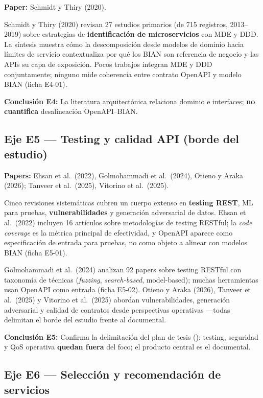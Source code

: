 \textbf{Paper:} Schmidt y Thiry (2020).

Schmidt y Thiry (2020) revisan 27 estudios primarios (de 715 registros, 2013--2019) sobre
estrategias de \textbf{identificación de microservicios} con MDE y DDD. La síntesis muestra cómo la
descomposición desde modelos de dominio hacia límites de servicio contextualiza por qué los
\ServiceDomain{} BIAN son referencia de negocio y las APIs su capa de exposición. Pocos trabajos
integran MDE y DDD conjuntamente; ninguno mide coherencia entre contrato OpenAPI y modelo BIAN
(ficha E4-01).

\textbf{Conclusión E4:} La literatura arquitectónica relaciona dominio e interfaces; \textbf{no
cuantifica} desalineación OpenAPI--BIAN.

\subsection{Eje E5 --- Testing y calidad API (borde del estudio)}

\textbf{Papers:} Ehsan et al.\ (2022), Golmohammadi et al.\ (2024), Otieno y Araka (2026); Tanveer
et al.\ (2025), Vitorino et al.\ (2025).

Cinco revisiones sistemáticas cubren un cuerpo extenso en \textbf{testing REST}, ML para pruebas,
\textbf{vulnerabilidades} y generación adversarial de datos. Ehsan et al.\ (2022) incluyen 16
artículos sobre metodologías de testing RESTful; la \textit{code coverage} es la métrica principal de
efectividad, y OpenAPI aparece como especificación de entrada para pruebas, no como objeto a alinear
con modelos BIAN (ficha E5-01).

Golmohammadi et al.\ (2024) analizan 92 papers sobre testing RESTful con taxonomía de técnicas
(\textit{fuzzing}, \textit{search-based}, model-based); muchas herramientas usan OpenAPI como
entrada (ficha E5-02). Otieno y Araka (2026), Tanveer et al.\ (2025) y Vitorino et al.\ (2025)
abordan vulnerabilidades, generación adversarial y calidad de contratos desde perspectivas
operativas ---todas delimitan el borde del estudio frente al \AlignmentScore{} documental.

\textbf{Conclusión E5:} Confirma la delimitación del plan de tesis (): testing,
seguridad y QoS operativa \textbf{quedan fuera} del foco; el producto central es el
\AlignmentScore{} documental.

\subsection{Eje E6 --- Selección y recomendación de servicios}

